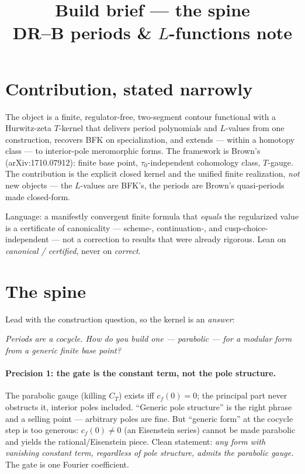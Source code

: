 \documentclass[11pt]{article}
\title{\vspace{-2.5em}Build brief --- the spine\\[0.3em]
\large DR--B periods \& \texorpdfstring{$L$}{L}-functions note}
\author{}
\date{}
\begin{document}
\maketitle
\vspace{-3.5em}

\section*{Contribution, stated narrowly}

The object is a finite, regulator-free, two-segment contour functional with a
Hurwitz-zeta $T$-kernel that delivers period polynomials and $L$-values from one
construction, recovers BFK on specialization, and extends --- within a homotopy
class --- to interior-pole meromorphic forms. The framework is Brown's
(arXiv:1710.07912): finite base point, $\tau_0$-independent cohomology class,
$T$-gauge. The contribution is the explicit closed kernel and the unified finite
realization, \emph{not} new objects --- the $L$-values are BFK's, the periods are
Brown's quasi-periods made closed-form.

Language: a manifestly convergent finite formula that \emph{equals} the regularized
value is a certificate of canonicality --- scheme-, continuation-, and
cusp-choice-independent --- not a correction to results that were already rigorous.
Lean on \emph{canonical / certified}, never on \emph{correct}.

\section*{The spine}

Lead with the construction question, so the kernel is an \emph{answer}:

\begin{center}\itshape
Periods are a cocycle. How do you build one --- parabolic --- for a modular form
from a generic finite base point?
\end{center}

\paragraph{Precision 1: the gate is the constant term, not the pole structure.}
The parabolic gauge (killing $C_T$) exists iff $c_f(0)=0$; the principal part never
obstructs it, interior poles included. ``Generic pole structure'' is the right
phrase and a selling point --- arbitrary poles are fine. But ``generic form'' at the
cocycle step is too generous: $c_f(0)\neq0$ (an Eisenstein series) cannot be made
parabolic and yields the rational/Eisenstein piece. Clean statement: \emph{any form
with vanishing constant term, regardless of pole structure, admits the parabolic
gauge.} The gate is one Fourier coefficient.
\end{document}
